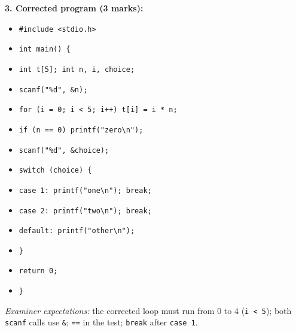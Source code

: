 \documentclass[11pt]{article}
\begin{document}
\begin{corrige}
\textbf{3. Corrected program (3 marks):}
\begin{itemize}
\item \texttt{\#include <stdio.h>}
\item \texttt{int main() \{}
\item \texttt{\quad int t[5]; int n, i, choice;}
\item \texttt{\quad scanf("\%d", \&n);}
\item \texttt{\quad for (i = 0; i < 5; i++) t[i] = i * n;}
\item \texttt{\quad if (n == 0) printf("zero\textbackslash n");}
\item \texttt{\quad scanf("\%d", \&choice);}
\item \texttt{\quad switch (choice) \{}
\item \texttt{\quad\quad case 1: printf("one\textbackslash n"); break;}
\item \texttt{\quad\quad case 2: printf("two\textbackslash n"); break;}
\item \texttt{\quad\quad default: printf("other\textbackslash n");}
\item \texttt{\quad \}}
\item \texttt{\quad return 0;}
\item \texttt{\}}
\end{itemize}
\emph{Examiner expectations:} the corrected loop must run from $0$ to $4$ (\texttt{i < 5}); both \texttt{scanf} calls use \texttt{\&}; \texttt{==} in the test; \texttt{break} after \texttt{case 1}.
\end{corrige}
\end{document}
